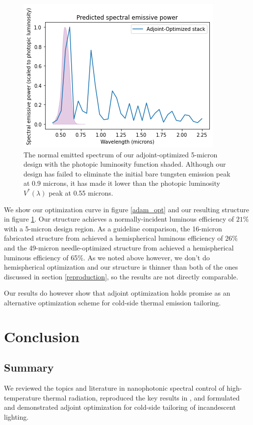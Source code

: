 \documentclass[%
 reprint,
 amsmath,amssymb,
 aps
]{revtex4-2}
\begin{document}
\begin{figure}
\centering
\includegraphics[width=1.\linewidth]{predicted_emissivity.png}
\caption{The normal emitted spectrum of our adjoint-optimized 5-micron design with the photopic luminosity function shaded. Although our design has failed to eliminate the initial bare tungsten emission peak at 0.9 microns, it has made it lower than the photopic luminosity $V^*(\lambda)$ peak at 0.55 microns.} 
\label{adam_struct}
\end{figure}

We show our optimization curve in figure \ref{adam_opt} and our resulting structure in figure \ref{adam_struct}. Our structure achieves a normally-incident luminous efficiency of $21\%$ with a 5-micron design region. As a guideline comparison, the 16-micron fabricated structure from \cite{ilic} achieved a hemispherical luminous efficiency of $26\%$ and the 49-micron needle-optimized structure from \cite{ilic} achieved a hemispherical luminous efficiency of 65\%. As we noted above however, we don't do hemispherical optimization and our structure is thinner than both of the ones discussed in section \ref{reproduction}, so the results are not directly comparable. 

Our results do however show that adjoint optimization holds promise as an alternative optimization scheme for cold-side thermal emission tailoring.
\section{Conclusion}

\subsection{Summary}
We reviewed the topics and literature in nanophotonic spectral control of high-temperature thermal radiation, reproduced the key results in \cite{ilic}, and formulated and demonstrated adjoint optimization for cold-side tailoring of incandescent lighting. 
\end{document}
